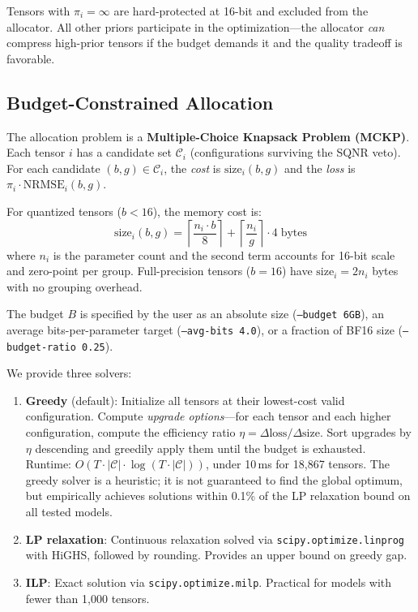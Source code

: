 \documentclass{article}
\begin{document}
Tensors with $\pi_i = \infty$ are hard-protected at 16-bit and excluded from the allocator. All other priors participate in the optimization---the allocator \emph{can} compress high-prior tensors if the budget demands it and the quality tradeoff is favorable.

\subsection{Budget-Constrained Allocation}

The allocation problem is a \textbf{Multiple-Choice Knapsack Problem (MCKP)}. Each tensor $i$ has a candidate set $\mathcal{C}_i$ (configurations surviving the SQNR veto). For each candidate $(b, g) \in \mathcal{C}_i$, the \emph{cost} is $\text{size}_i(b, g)$ and the \emph{loss} is $\pi_i \cdot \text{NRMSE}_i(b, g)$.

For quantized tensors ($b < 16$), the memory cost is:
\begin{equation}
    \text{size}_i(b, g) = \left\lceil \frac{n_i \cdot b}{8} \right\rceil + \left\lceil \frac{n_i}{g} \right\rceil \cdot 4 \;\text{bytes}
    \label{eq:size}
\end{equation}
where $n_i$ is the parameter count and the second term accounts for 16-bit scale and zero-point per group. Full-precision tensors ($b = 16$) have $\text{size}_i = 2 n_i$ bytes with no grouping overhead.

The budget $B$ is specified by the user as an absolute size (\texttt{--budget 6GB}), an average bits-per-parameter target (\texttt{--avg-bits 4.0}), or a fraction of BF16 size (\texttt{--budget-ratio 0.25}).

We provide three solvers:
\begin{enumerate}
    \item \textbf{Greedy} (default): Initialize all tensors at their lowest-cost valid configuration. Compute \emph{upgrade options}---for each tensor and each higher configuration, compute the efficiency ratio $\eta = \Delta\text{loss} / \Delta\text{size}$. Sort upgrades by $\eta$ descending and greedily apply them until the budget is exhausted. Runtime: $O(T \cdot |\mathcal{C}| \cdot \log(T \cdot |\mathcal{C}|))$, under 10\,ms for 18{,}867 tensors. The greedy solver is a heuristic; it is not guaranteed to find the global optimum, but empirically achieves solutions within 0.1\% of the LP relaxation bound on all tested models.
    \item \textbf{LP relaxation}: Continuous relaxation solved via \texttt{scipy.optimize.linprog} with HiGHS, followed by rounding. Provides an upper bound on greedy gap.
    \item \textbf{ILP}: Exact solution via \texttt{scipy.optimize.milp}. Practical for models with fewer than 1{,}000 tensors.
\end{enumerate}
\end{document}
